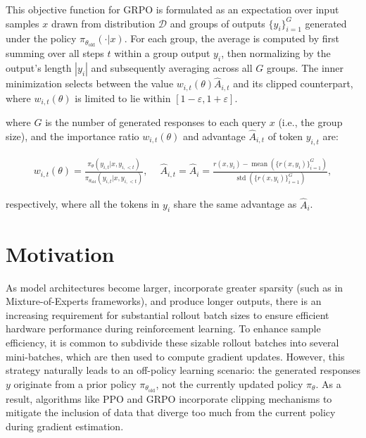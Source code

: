 This objective function for GRPO is formulated as an expectation over input samples $x$ drawn from distribution $\mathcal{D}$ and groups of outputs $\{y_i\}_{i=1}^G$ generated under the policy $\pi_{\theta_\text{old}}(\cdot | x)$. For each group, the average is computed by first summing over all steps $t$ within a group output $y_i$, then normalizing by the output’s length $|y_i|$ and subsequently averaging across all $G$ groups. The inner minimization selects between the value $w_{i,t}(\theta) \widehat{A}_{i,t}$ and its clipped counterpart, where $w_{i,t}(\theta)$ is limited to lie within $[1 - \varepsilon, 1 + \varepsilon]$.

where $G$ is the number of generated responses to each query $x$ (i.e., the group size), and the importance ratio $w_{i,t}(\theta)$ and advantage $\widehat{A}_{i,t}$ of token $y_{i,t}$ are:

\begin{align}
    w_{i,t}(\theta)=\frac{ \pi_{\theta} (y_{i,t} | x, y_{i,<t}) }{ \pi_{\theta_\text{old}} (y_{i,t} | x,y_{i,<t})},\quad\ 
    \widehat{A}_{i,t} = \widehat{A}_{i} = \frac{r(x, y_i) - \operatorname{mean} \left( \{ r(x, y_i) \}_{i=1}^G \right) }{ \operatorname{std} \left( \{ r(x, y_i) \}_{i=1}^G \right) },
\end{align}

respectively, where all the tokens in $y_i$ share the same advantage as $\widehat{A}_{i}$.

\section{Motivation}
\label{sec:motivation}

As model architectures become larger, incorporate greater sparsity (such as in Mixture-of-Experts frameworks), and produce longer outputs, there is an increasing requirement for substantial rollout batch sizes to ensure efficient hardware performance during reinforcement learning. To enhance sample efficiency, it is common to subdivide these sizable rollout batches into several mini-batches, which are then used to compute gradient updates. However, this strategy naturally leads to an off-policy learning scenario: the generated responses $y$ originate from a prior policy $\pi_{\theta_\text{old}}$, not the currently updated policy $\pi_\theta$. As a result, algorithms like PPO and GRPO incorporate clipping mechanisms to mitigate the inclusion of data that diverge too much from the current policy during gradient estimation.

